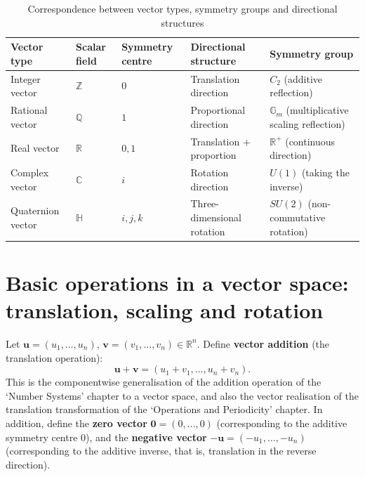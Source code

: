 \begin{table}[htbp]
    \centering
    \caption{Correspondence between vector types, symmetry groups and directional structures}
    \label{tab:vector_types}
    \begin{tabular}{>{\centering\arraybackslash}p{2.2cm}>{\centering\arraybackslash}p{2cm}>{\centering\arraybackslash}p{2.5cm}>{\centering\arraybackslash}p{3cm}>{\centering\arraybackslash}p{2.5cm}}
        \toprule
        Vector type & Scalar field & Symmetry centre & Directional structure & Symmetry group \\
        \midrule
        Integer vector & $\mathbb{Z}$ & $0$ & Translation direction & $C_2$ (additive reflection) \\
        Rational vector & $\mathbb{Q}$ & $1$ & Proportional direction & $\mathbb{G}_m$ (multiplicative scaling reflection) \\
        Real vector & $\mathbb{R}$ & $0,1$ & Translation + proportion & $\mathbb{R}^+$ (continuous direction) \\
        Complex vector & $\mathbb{C}$ & $i$ & Rotation direction & $U(1)$ (taking the inverse) \\
        Quaternion vector & $\mathbb{H}$ & $i,j,k$ & Three-dimensional rotation & $SU(2)$ (non-commutative rotation) \\
        \bottomrule
    \end{tabular}
\end{table}
\section{\texorpdfstring{Basic operations in a vector space: translation, scaling and rotation}{Basic operations in a vector space: translation, scaling and rotation}}

\begin{definition}\label{def:vector_addition_translation}
Let $\mathbf{u} = (u_1,\dots,u_n)$, $\mathbf{v} = (v_1,\dots,v_n) \in \mathbb{R}^n$. Define \textbf{vector addition} (the translation operation):
\[\mathbf{u} + \mathbf{v} = (u_1+v_1, \dots, u_n+v_n).\]
This is the componentwise generalisation of the addition operation of the `Number Systems' chapter to a vector space, and also the vector realisation of the translation transformation of the `Operations and Periodicity' chapter. In addition, define the \textbf{zero vector} $\mathbf{0} = (0,\dots,0)$ (corresponding to the additive symmetry centre $0$), and the \textbf{negative vector} $-\mathbf{u} = (-u_1,\dots,-u_n)$ (corresponding to the additive inverse, that is, translation in the reverse direction).
\end{definition}

